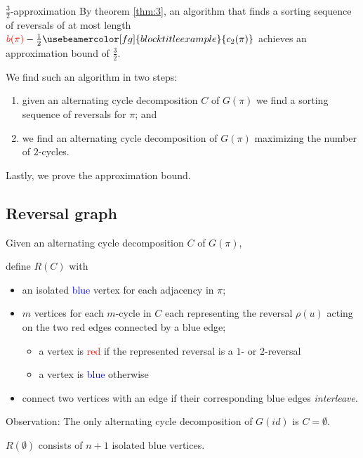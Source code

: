 \documentclass{beamer}
\theoremstyle{definition}
\def\spadding{\vspace{0.25cm}}
\def\b{\textcolor{blue}}
\def\r{\textcolor{red}}
\def\g#1{{\usebeamercolor[fg]{block title example}{#1}}}
\begin{document}
\begin{frame}

\begin{block}{$\frac{3}{2}$-approximation}
By theorem \ref{thm:3}, an algorithm that finds a sorting sequence of reversals of at most length $\r{b(\pi)} - \frac{1}{2} \g{c_2(\pi)}$ achieves an approximation bound of $\frac{3}{2}$. \pause\spadding

We find such an algorithm in two steps:
\begin{enumerate}
    \item given an alternating cycle decomposition $C$ of $G(\pi)$ we find a sorting sequence of reversals for $\pi$\pause; and
    \item we find an alternating cycle decomposition of $G(\pi)$ maximizing the number of $2$-cycles.
\end{enumerate}
\end{block}\pause

Lastly, we prove the approximation bound.

\end{frame}

\subsection{Reversal graph}

\begin{frame}

\begin{definition}
Given an alternating cycle decomposition $C$ of $G(\pi)$, \par\pause
define $R(C)$ with
\begin{itemize}
    \item an isolated \b{blue} vertex for each adjacency in $\pi$\pause;
    \item $m$ vertices for each $m$-cycle in $C$ each representing the reversal $\rho(u)$ acting on the two red edges connected by a blue edge\pause;
    \begin{itemize}
        \item a vertex is \r{red} if the represented reversal is a $1$- or $2$-reversal
        \item a vertex is \b{blue} otherwise
    \end{itemize}\pause
    \item connect two vertices with an edge if their corresponding blue edges \textit{interleave}.
\end{itemize}
\end{definition}\pause

Observation: The only alternating cycle decomposition of $G(id)$ is $C = \emptyset$.\pause

\begin{corollary}
$R(\emptyset)$ consists of $n+1$ isolated blue vertices.
\end{corollary}

\end{frame}
\end{document}
